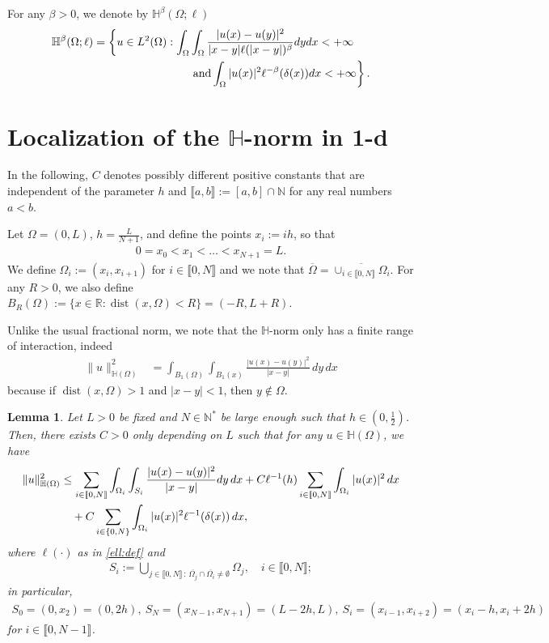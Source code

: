 \documentclass[11 pt]{article}
\newcommand\inter[1]{\llbracket #1\rrbracket}
\newtheorem{lemma}[theorem]{Lemma}
\numberwithin{equation}{section}
\def\dist{\operatorname{dist}}
\newcommand{\weH}[1]{\mathbb H^{#1}(\Omega;\ell)}
\def\R{\mathbb{R}}
\begin{document}
For any $\beta>0$, we denote by $\weH{\beta}$
%
\begin{align}\notag
    \weH{\beta}&=\left\{ u\in L^2(\Omega): \int_{\Omega}\int_{\Omega}\frac{|u(x)-u(y)|^2}{|x-y|\ell(|x-y|)^{\beta}}dydx<+\infty \right. \\
    &\hspace{3 cm}\left. \textnormal{and} \int_{\Omega}|u(x)|^2\ell^{-\beta}(\delta(x))dx <+\infty\right\}.\label{H:weights:def}
\end{align}

\section{Localization of the $\mathbb{H}$-norm in 1-d}

In the following, $C$ denotes possibly different positive constants that are independent of the parameter $h$ and $\inter{a,b}:=[a,b]\cap\mathbb{N}$ for any real numbers $a<b$. 

Let $\Omega=(0,L)$, $h=\frac{L}{N+1}$, and define the points $x_i:=ih$, so that
%
\begin{align}
0=x_0<x_1<\ldots<x_{N+1}=L.
\end{align}
We define $\Omega_i:=(x_{i},x_{i+1})$ for $i\in\inter{0,N}$ and we note that $\overline{\Omega}=\overline{\cup_{i\in\inter{0,N}}\Omega_i}$. For any $R>0$, we also define $B_{R}(\Omega):=\{x\in\R:\dist(x,\Omega)<R\}=(-R,L+R)$.

Unlike the usual fractional norm, we note that the $\mathbb H$-norm only has a finite range of interaction, indeed
%
\begin{align}\label{eq:norm_R_bound}
    \|u\|^2_{\mathbb H(\Omega)} &=\int_{B_1(\Omega)}\int_{B_1(x)}\frac{|u(x)-u(y)|^2}{|x-y|}\, dy\, dx
\end{align}
%
because if $\dist(x,\Omega)>1$ and $|x-y|<1$, then $y\not\in \Omega$.

\begin{lemma}\label{lem:localization_enorm}
Let $L>0$ be fixed and $N\in\mathbb N^*$ be large enough such that $h\in(0,\frac{1}{2})$. Then, there exists $C>0$ only depending on $L$ such that for any $u\in \mathbb{H}(\Omega)$, we have
   \begin{align}\notag
    \|u\|^2_{\mathbb H(\Omega)} &\leq \sum_{i\in\inter{0,N}}\int_{\Omega_i}\int_{S_i}\frac{|u(x)-u(y)|^2}{|x-y|}dy\,dx+C\ell^{-1}(h)\sum_{i\in\inter{0,N}}\int_{\Omega_i}|u(x)|^2\,dx\\
    &\quad +C\sum_{i\in\{0,N\}}\int_{\Omega_i}|u(x)|^2\ell^{-1}(\delta(x))\,dx,
\end{align}
%
where $\ell(\cdot)$ as in \eqref{ell:def} and
%
\begin{align}\label{eq:def_Si}
    S_i:=\bigcup_{j\in\inter{0,N}\,:\,\overline{\Omega_j}\cap \overline{\Omega_i}\neq \emptyset}\Omega_j, \quad i\in\inter{0,N};
\end{align}
%
in particular,
\begin{align*}
S_0=(0,x_2)=(0,2h),\ S_{N}=(x_{N-1},x_{N+1})=(L-2h,L),\ S_{i}=(x_{i-1},x_{i+2})=(x_i-h,x_i+2h)
\end{align*}
for $i\in \inter{0,N-1}$.
\end{lemma}
%
\end{document}
